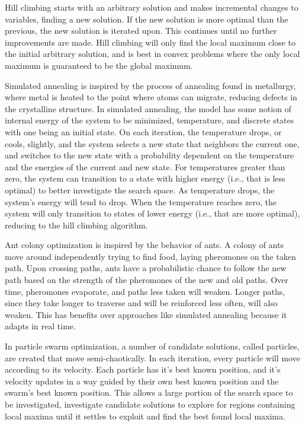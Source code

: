 \documentclass[12pt,dvipsnames]{report}
\begin{document}
Hill climbing starts with an arbitrary solution and makes incremental changes to variables, finding a new solution.  If the new solution is more optimal than the previous, the new solution is iterated upon.  This continues until no further improvements are made.  Hill climbing will only find the local maximum close to the initial arbitrary solution, and is best in convex problems where the only local maximum is guaranteed to be the global maximum.

Simulated annealing is inspired by the process of annealing found in metallurgy, where metal is heated to the point where atoms can migrate, reducing defects in the crystalline structure.  In simulated annealing, the model has some notion of internal energy of the system to be minimized, temperature, and discrete states with one being an initial state.  On each iteration, the temperature drops, or cools, slightly, and the system selects a new state that neighbors the current one, and switches to the new state with a probability dependent on the temperature and the energies of the current and new state.  For temperatures greater than zero, the system can transition to a state with higher energy (i.e., that is less optimal) to better investigate the search space.  As temperature drops, the system's energy will tend to drop.  When the temperature reaches zero, the system will only transition to states of lower energy (i.e., that are more optimal), reducing to the hill climbing algorithm.

Ant colony optimization is inspired by the behavior of ants.  A colony of ants move around independently trying to find food, laying pheromones on the taken path.  Upon crossing paths, ants have a probabilistic chance to follow the new path based on the strength of the pheromones of the new and old paths.  Over time, pheromones evaporate, and paths less taken will weaken.  Longer paths, since they take longer to traverse and will be reinforced less often, will also weaken.  This has benefits over approaches like simulated annealing because it adapts in real time.

In particle swarm optimization, a number of candidate solutions, called particles, are created that move semi-chaotically.  In each iteration, every particle will move according to its velocity.  Each particle has it's best known position, and it's velocity updates in a way guided by their own best known position and the swarm's best known position.  This allows a large portion of the search space to be investigated, investigate candidate solutions to explore for regions containing local maxima until it settles to exploit and find the best found local maxima.
\end{document}
